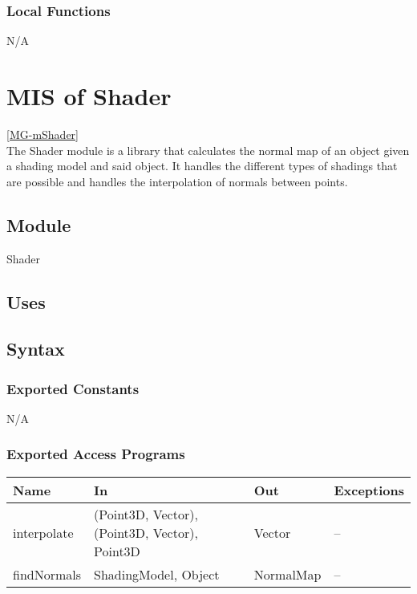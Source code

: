 \documentclass[12pt, titlepage]{article}
\begin{document}
\subsubsection{Local Functions}
N/A

\newpage

\section{MIS of Shader} \ref{MG-mShader} \\
The Shader module is a library that calculates the normal map of an object 
given a shading model and said object. It handles the different types of 
shadings that are possible and handles the interpolation of normals between 
points.

\subsection{Module}
Shader

\subsection{Uses}

\subsection{Syntax}
\subsubsection{Exported Constants}
N/A
\subsubsection{Exported Access Programs}
\begin{center}
	\begin{tabular}{p{3cm} p{4cm} p{2cm} p{4cm}}
		\hline
		\textbf{Name} & \textbf{In} & \textbf{Out} & \textbf{Exceptions} \\
		\hline
		interpolate & (Point3D, Vector), (Point3D, Vector), Point3D & Vector & 
		-- \\
		findNormals & ShadingModel, Object & NormalMap & -- \\
		\hline
	\end{tabular}
\end{center}
\end{document}
